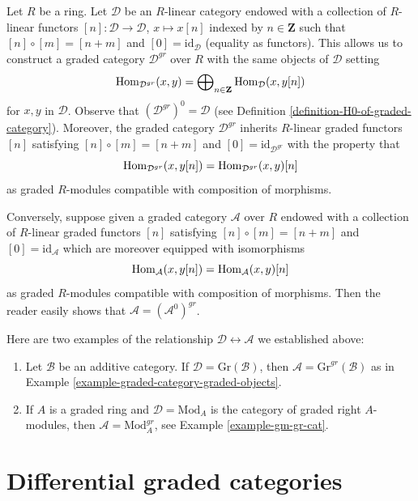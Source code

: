 \begin{remark}
\label{remark-graded-shift-functors}
Let $R$ be a ring. Let $\mathcal{D}$ be an $R$-linear category endowed with a
collection of $R$-linear functors $[n] : \mathcal{D} \to \mathcal{D}$,
$x \mapsto x[n]$ indexed by $n \in \mathbf{Z}$ such that
$[n] \circ [m] = [n + m]$ and $[0] = \text{id}_\mathcal{D}$ (equality as
functors). This allows us to construct a graded category $\mathcal{D}^{gr}$
over $R$ with the same objects of $\mathcal{D}$ setting
$$
\mathop{\mathrm{Hom}}\nolimits_{\mathcal{D}^{gr}}(x, y) =
\bigoplus\nolimits_{n \in \mathbf{Z}} \mathop{\mathrm{Hom}}\nolimits_\mathcal{D}(x, y[n])
$$
for $x, y$ in $\mathcal{D}$. Observe that $(\mathcal{D}^{gr})^0 = \mathcal{D}$
(see Definition \ref{definition-H0-of-graded-category}). Moreover, the graded
category $\mathcal{D}^{gr}$ inherits $R$-linear graded functors $[n]$
satisfying $[n] \circ [m] = [n + m]$ and $[0] = \text{id}_{\mathcal{D}^{gr}}$
with the property that
$$
\mathop{\mathrm{Hom}}\nolimits_{\mathcal{D}^{gr}}(x, y[n]) = \mathop{\mathrm{Hom}}\nolimits_{\mathcal{D}^{gr}}(x, y)[n]
$$
as graded $R$-modules compatible with composition of morphisms.

\medskip\noindent
Conversely, suppose given a graded category $\mathcal{A}$ over $R$ endowed
with a collection of $R$-linear graded functors $[n]$
satisfying $[n] \circ [m] = [n + m]$ and $[0] = \text{id}_\mathcal{A}$
which are moreover equipped with isomorphisms
$$
\mathop{\mathrm{Hom}}\nolimits_\mathcal{A}(x, y[n]) = \mathop{\mathrm{Hom}}\nolimits_\mathcal{A}(x, y)[n]
$$
as graded $R$-modules compatible with composition of morphisms. Then
the reader easily shows that $\mathcal{A} = (\mathcal{A}^0)^{gr}$.

\medskip\noindent
Here are two examples of the relationship
$\mathcal{D} \leftrightarrow \mathcal{A}$ we established above:
\begin{enumerate}
\item Let $\mathcal{B}$ be an additive category. If
$\mathcal{D} = \text{Gr}(\mathcal{B})$, then
$\mathcal{A} = \text{Gr}^{gr}(\mathcal{B})$ as in
Example \ref{example-graded-category-graded-objects}.
\item If $A$ is a graded ring and $\mathcal{D} = \text{Mod}_A$
is the category of graded right $A$-modules, then
$\mathcal{A} = \text{Mod}^{gr}_A$, see Example \ref{example-gm-gr-cat}.
\end{enumerate}
\end{remark}






\section{Differential graded categories}
\label{section-dga-categories}

